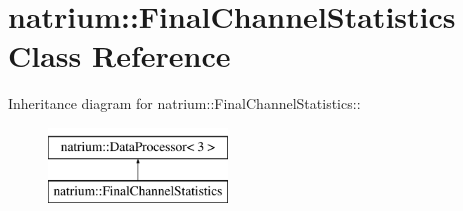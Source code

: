 \hypertarget{classnatrium_1_1FinalChannelStatistics}{
\section{natrium::FinalChannelStatistics Class Reference}
\label{classnatrium_1_1FinalChannelStatistics}
}
Inheritance diagram for natrium::FinalChannelStatistics::\begin{figure}[H]
\begin{center}
\leavevmode
\includegraphics[height=2cm]{classnatrium_1_1FinalChannelStatistics}
\end{center}
\end{figure}
